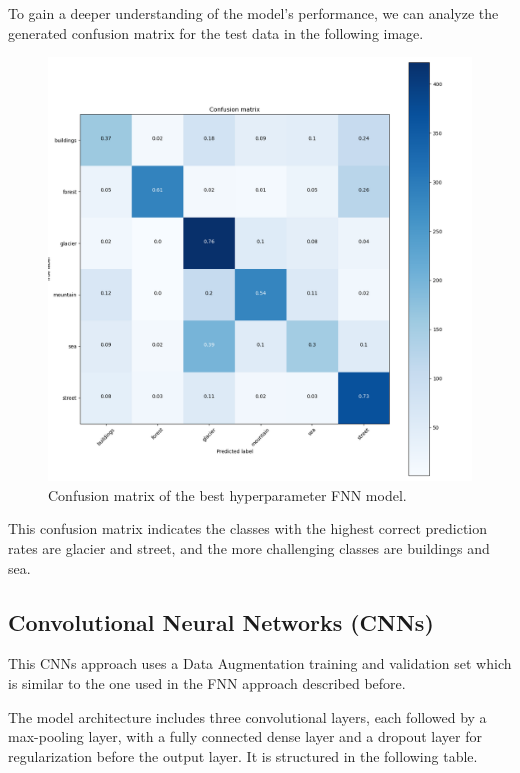 To gain a deeper understanding of the model's performance, we can analyze the generated confusion matrix for the test data in the following image.
\begin{figure}[H]
    \centering
    \includegraphics[width=1\linewidth]{images/fnn_cm.png}
    \caption{Confusion matrix of the best hyperparameter FNN model.}
    \label{fig:FNN_cm}
\end{figure}
This confusion matrix indicates the classes with the highest correct prediction rates are glacier and street, and the more challenging classes are buildings and sea. 

\subsection{Convolutional Neural Networks (CNNs)}
This CNNs approach uses a Data Augmentation training and validation set which is similar to the one used in the FNN approach described before.

The model architecture includes three convolutional layers, each followed by a max-pooling layer, with a fully connected dense layer and a dropout layer for regularization before the output layer. It is structured in the following table.

